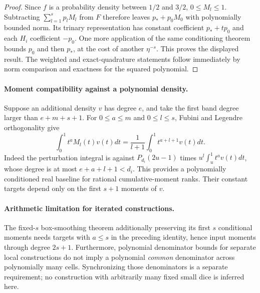 \documentclass[11pt]{article}
\begin{document}
\begin{proof}
Since $f$ is a probability density between $1/2$ and $3/2$,
$0\le M_l\le1$. Subtracting $\sum_{l=1}^sp_lM_l$ from $F$
therefore leaves $p_*+p_0M_0$ with polynomially bounded norm.
Its trinary representation has constant coefficient $p_*+tp_0$
and each $H_i$ coefficient $-p_0$. One more application of the
same conditioning theorem bounds $p_0$ and then $p_*$, at the cost
of another $\eta^{-s}$. This proves the displayed result. The
weighted and exact-quadrature statements follow immediately by norm
comparison and exactness for the squared polynomial.
\end{proof}

\paragraph{Moment compatibility against a polynomial density.}
Suppose an additional density $v$ has degree $e$, and take the first
band degree larger than $e+m+s+1$. For $0\le a\le m$ and $0\le l\le s$,
Fubini and Legendre orthogonality give
\[
 \int_0^1 t^a M_l(t)v(t)dt
 =\frac1{l+1}\int_0^1t^{a+l+1}v(t)dt.
\]
Indeed the perturbation integral is against $P_{d_i}(2u-1)$ times
$u^l\int_u^1t^av(t)dt$, whose degree is at most $e+a+l+1<d_i$.
This provides a polynomially conditioned real baseline for rational
cumulative-moment ranks. Their constant targets depend only on the
first $s+1$ moments of $v$.

\paragraph{Arithmetic limitation for iterated constructions.}
The fixed-$s$ box-smoothing theorem additionally preserving its first
$s$ conditional moments needs targets with $a\le s$ in the preceding
identity, hence input moments through degree $2s+1$. Furthermore,
polynomial denominator bounds for separate local constructions do not
imply a polynomial \emph{common} denominator across polynomially many
cells. Synchronizing those denominators is a separate requirement;
no construction with arbitrarily many fixed small dice is inferred here.
\end{document}
